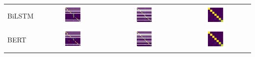 \documentclass[a4paper]{article}
\begin{document}
\begin{table}[h]
\begin{adjustbox}{max width=\textwidth}
\begin{tabular}{l|ccc}
			BiLSTM &  \includegraphics[width=0.3\textwidth]{../assets/CM_BiLSTM_intent_ATIS_labeless} & \includegraphics[width=0.3\textwidth]{../assets/CM_BiLSTM_intent_remix_ATIS_labeless} &\includegraphics[width=0.3\textwidth]{../assets/CM_BiLSTM_intent_SNIPS_labeless} \\
			\cmidrule{1-4}
			BERT &  \includegraphics[width=0.3\textwidth]{../assets/CM_BERT_intent_ATIS_labeless} & \includegraphics[width=0.3\textwidth]{../assets/CM_BERT_intent_remix_ATIS_labeless} &\includegraphics[width=0.3\textwidth]{../assets/CM_BERT_intent_SNIPS_labeless} \\

\end{tabular}
\end{adjustbox}
\end{table}
\end{document}
